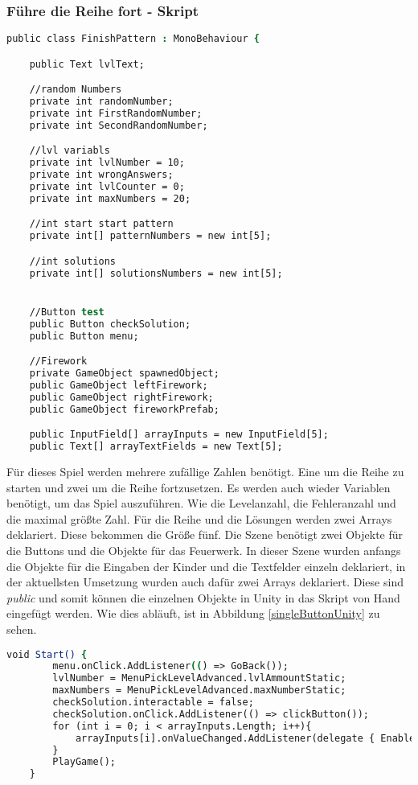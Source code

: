 \subsubsection{Führe die Reihe fort - Skript}
\begin{lstlisting}[language=csh, caption={hideCircle.cs Variablendeklaration}]
public class FinishPattern : MonoBehaviour {

	public Text lvlText;

	//random Numbers
	private int randomNumber;
	private int FirstRandomNumber;
	private int SecondRandomNumber;

	//lvl variabls
	private int lvlNumber = 10;
	private int wrongAnswers;
	private int lvlCounter = 0;
	private int maxNumbers = 20;

	//int start start pattern
	private int[] patternNumbers = new int[5];

	//int solutions
	private int[] solutionsNumbers = new int[5];


	//Button test
	public Button checkSolution;
	public Button menu;

	//Firework
	private GameObject spawnedObject;
	public GameObject leftFirework;
	public GameObject rightFirework;
	public GameObject fireworkPrefab;

	public InputField[] arrayInputs = new InputField[5];
	public Text[] arrayTextFields = new Text[5];
\end{lstlisting}
Für dieses Spiel werden mehrere zufällige Zahlen benötigt. Eine um die Reihe zu starten und zwei um die Reihe fortzusetzen. Es werden auch wieder Variablen benötigt, um das Spiel auszuführen. Wie die Levelanzahl, die Fehleranzahl und die maximal größte Zahl. Für die Reihe und die Lösungen werden zwei Arrays deklariert. Diese bekommen die Größe fünf. Die Szene benötigt zwei Objekte für die Buttons und die Objekte für das Feuerwerk. In dieser Szene wurden anfangs die Objekte für die Eingaben der Kinder und die Textfelder einzeln deklariert, in der aktuellsten Umsetzung wurden auch dafür zwei Arrays deklariert. Diese sind \textit{public} und somit können die einzelnen Objekte in Unity in das Skript von Hand eingefügt werden. Wie dies abläuft, ist in Abbildung \ref{singleButtonUnity} zu sehen.\\
\begin{lstlisting}[language=csh, caption={hideCircle.cs Start-Funktion}]
	void Start() {
		menu.onClick.AddListener(() => GoBack());
		lvlNumber = MenuPickLevelAdvanced.lvlAmmountStatic;
		maxNumbers = MenuPickLevelAdvanced.maxNumberStatic;
		checkSolution.interactable = false;
		checkSolution.onClick.AddListener(() => clickButton());
		for (int i = 0; i < arrayInputs.Length; i++){
			arrayInputs[i].onValueChanged.AddListener(delegate { EnableButton(); });
		}
		PlayGame();
	}
\end{lstlisting}
